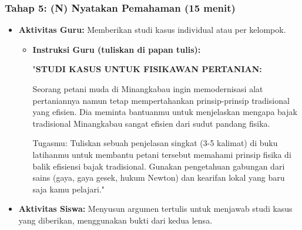 \documentclass[12pt,a4paper]{article}
\begin{document}
\subsubsection{Tahap 5: (N) Nyatakan Pemahaman (15 menit)}
\begin{itemize}
\item \textbf{Aktivitas Guru:} Memberikan studi kasus individual atau per kelompok.
    \begin{itemize}
    \item \textbf{Instruksi Guru (tuliskan di papan tulis):}
    
    "\textbf{STUDI KASUS UNTUK FISIKAWAN PERTANIAN:}
    
    Seorang petani muda di Minangkabau ingin memodernisasi alat pertaniannya namun tetap mempertahankan prinsip-prinsip tradisional yang efisien. Dia meminta bantuanmu untuk menjelaskan mengapa bajak tradisional Minangkabau sangat efisien dari sudut pandang fisika.
    
    Tugasmu: Tuliskan sebuah penjelasan singkat (3-5 kalimat) di buku latihanmu untuk membantu petani tersebut memahami prinsip fisika di balik efisiensi bajak tradisional. Gunakan pengetahuan gabungan dari sains (gaya, gaya gesek, hukum Newton) dan kearifan lokal yang baru saja kamu pelajari."
    \end{itemize}
\item \textbf{Aktivitas Siswa:} Menyusun argumen tertulis untuk menjawab studi kasus yang diberikan, menggunakan bukti dari kedua lensa.
\end{itemize}
\end{document}
